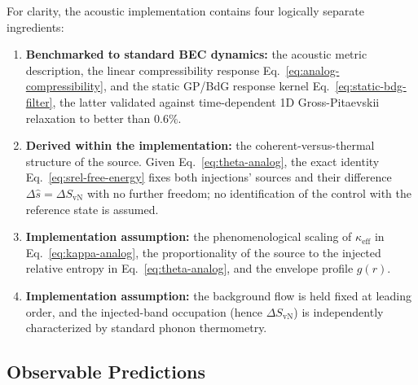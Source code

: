 \documentclass[aps,prd,twocolumn,superscriptaddress,nofootinbib,floatfix]{revtex4-2}
\begin{document}
For clarity, the acoustic implementation contains four logically separate ingredients:
\begin{enumerate}
    \item \textbf{Benchmarked to standard BEC dynamics:} the acoustic metric description, the linear compressibility response Eq.~\eqref{eq:analog-compressibility}, and the static GP/BdG response kernel Eq.~\eqref{eq:static-bdg-filter}, the latter validated against time-dependent 1D Gross-Pitaevskii relaxation to better than $0.6\%$.
    \item \textbf{Derived within the implementation:} the coherent-versus-thermal structure of the source. Given Eq.~\eqref{eq:theta-analog}, the exact identity Eq.~\eqref{eq:srel-free-energy} fixes both injections' sources and their difference $\Delta \hat{s} = \Delta S_{\mathrm{vN}}$ with no further freedom; no identification of the control with the reference state is assumed.
    \item \textbf{Implementation assumption:} the phenomenological scaling of $\kappa_{\mathrm{eff}}$ in Eq.~\eqref{eq:kappa-analog}, the proportionality of the source to the injected relative entropy in Eq.~\eqref{eq:theta-analog}, and the envelope profile $g(r)$.
    \item \textbf{Implementation assumption:} the background flow is held fixed at leading order, and the injected-band occupation (hence $\Delta S_{\mathrm{vN}}$) is independently characterized by standard phonon thermometry.
\end{enumerate}

\subsection{Observable Predictions}
\end{document}
